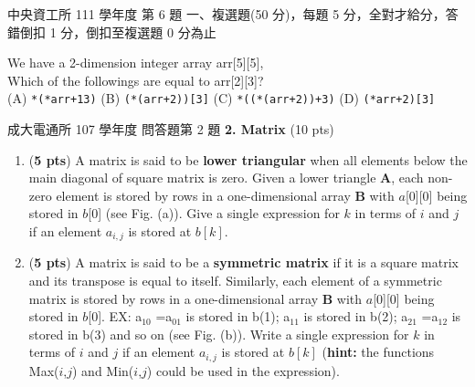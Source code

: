 \begin{pastexam}[label={px:arr-2}]{中央資工所 111 學年度 第 6 題}
一、複選題(50 分)，每題 5 分，全對才給分，答錯倒扣 1 分，倒扣至複選題 0 分為止

We have a 2-dimension integer array arr[5][5],\\
Which of the followings are equal to arr[2][3]?\\
(A) \texttt{*(*arr+13)} \quad (B) \texttt{(*(arr+2))[3]} \quad
(C) \texttt{*((*(arr+2))+3)} \quad (D) \texttt{(*arr+2)[3]}
\end{pastexam}

\begin{pastexam}[label={px:arr-3}]{成大電通所 107 學年度 問答題第 2 題}
\textbf{2. Matrix} (10 pts)
\begin{enumerate}[label=\alph*.]
\item (\textbf{5 pts}) A matrix is said to be \textbf{lower triangular} when all elements
below the main diagonal of square matrix is zero. Given a lower triangle \textbf{A}, each
non-zero element is stored by rows in a one-dimensional array \textbf{B} with $a$[0][0]
being stored in $b$[0] (see Fig. (a)). Give a single expression for $k$ in terms of $i$
and $j$ if an element $a_{i,j}$ is stored at $b[k]$.
\item (\textbf{5 pts}) A matrix is said to be a \textbf{symmetric matrix} if it is a
square matrix and its transpose is equal to itself. Similarly, each element of a
symmetric matrix is stored by rows in a one-dimensional array \textbf{B} with $a$[0][0]
being stored in $b$[0]. EX: a$_{10}$ =a$_{01}$ is stored in b(1); a$_{11}$ is stored in
b(2); a$_{21}$ =a$_{12}$ is stored in b(3) and so on (see Fig. (b)). Write a single
expression for $k$ in terms of $i$ and $j$ if an element $a_{i,j}$ is stored at $b[k]$
(\textbf{hint:} the functions Max($i$,$j$) and Min($i$,$j$) could be used in the
expression).
\end{enumerate}
\begin{center}
\end{center}
\end{pastexam}

